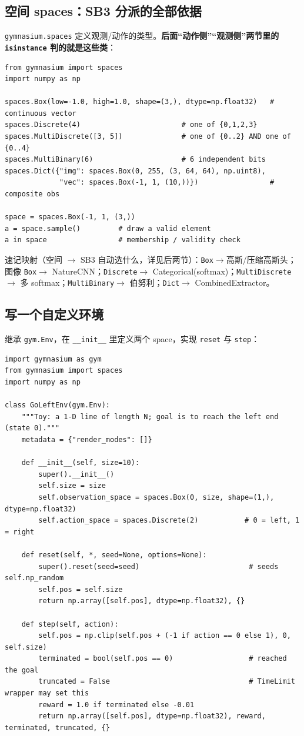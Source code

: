 \documentclass[11pt,a4paper]{article}
\begin{document}
\subsection{空间 spaces：SB3 分派的全部依据}

\texttt{gymnasium.spaces} 定义观测/动作的类型。\textbf{后面“动作侧”“观测侧”两节里的 \texttt{isinstance} 判的就是这些类}：

\begin{lstlisting}
from gymnasium import spaces
import numpy as np

spaces.Box(low=-1.0, high=1.0, shape=(3,), dtype=np.float32)   # continuous vector
spaces.Discrete(4)                        # one of {0,1,2,3}
spaces.MultiDiscrete([3, 5])              # one of {0..2} AND one of {0..4}
spaces.MultiBinary(6)                     # 6 independent bits
spaces.Dict({"img": spaces.Box(0, 255, (3, 64, 64), np.uint8),
             "vec": spaces.Box(-1, 1, (10,))})                 # composite obs

space = spaces.Box(-1, 1, (3,))
a = space.sample()         # draw a valid element
a in space                 # membership / validity check
\end{lstlisting}

速记映射（空间 $\to$ SB3 自动选什么，详见后两节）：\texttt{Box}$\to$高斯/压缩高斯头；图像 \texttt{Box}$\to$ NatureCNN；\texttt{Discrete}$\to$ Categorical(softmax)；\texttt{MultiDiscrete}$\to$ 多 softmax；\texttt{MultiBinary}$\to$ 伯努利；\texttt{Dict}$\to$ CombinedExtractor。

\subsection{写一个自定义环境}

继承 \texttt{gym.Env}，在 \texttt{\_\_init\_\_} 里定义两个 space，实现 \texttt{reset} 与 \texttt{step}：

\begin{lstlisting}
import gymnasium as gym
from gymnasium import spaces
import numpy as np

class GoLeftEnv(gym.Env):
    """Toy: a 1-D line of length N; goal is to reach the left end (state 0)."""
    metadata = {"render_modes": []}

    def __init__(self, size=10):
        super().__init__()
        self.size = size
        self.observation_space = spaces.Box(0, size, shape=(1,), dtype=np.float32)
        self.action_space = spaces.Discrete(2)           # 0 = left, 1 = right

    def reset(self, *, seed=None, options=None):
        super().reset(seed=seed)                          # seeds self.np_random
        self.pos = self.size
        return np.array([self.pos], dtype=np.float32), {}

    def step(self, action):
        self.pos = np.clip(self.pos + (-1 if action == 0 else 1), 0, self.size)
        terminated = bool(self.pos == 0)                  # reached the goal
        truncated = False                                 # TimeLimit wrapper may set this
        reward = 1.0 if terminated else -0.01
        return np.array([self.pos], dtype=np.float32), reward, terminated, truncated, {}
\end{lstlisting}
\end{document}
